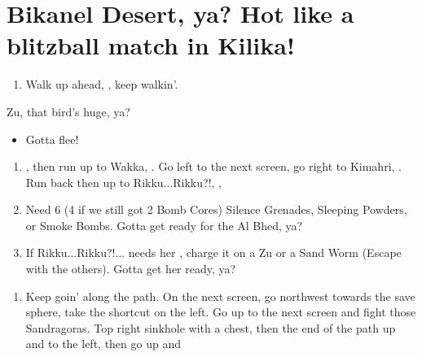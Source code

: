 \chapter{Bikanel Desert, ya? Hot like a blitzball match in Kilika!}

\begin{enumerate}
    \item Walk up ahead, \sd, keep walkin'.
\end{enumerate}
\begin{battle}{Zu, that bird's huge, ya?}
    \begin{itemize}
        \tidusf Tidus attacks, ya?
        \enemyf It attacks back!
        \tidusf Tidus equips Sonic Steel, like the Jecht Shot, ya?
        \tidusf Defend until Lulu shows up, gotta wait for backup, ya?
        \auronf Auron defends too, ya?
        \item Gotta flee!
    \end{itemize}
\end{battle}
\begin{enumerate}[resume]
    \item \sd, then run up to Wakka, \sd. Go left to the next screen, go right to Kimahri, \sd. Run back then up to Rikku...Rikku?!, \sd, \save
    \item Need 6 (4 if we still got 2 Bomb Cores) Silence Grenades, Sleeping Powders, or Smoke Bombs. Gotta get ready for the Al Bhed, ya?
    \item If Rikku...Rikku?!... needs her \od, charge it on a Zu or a Sand Worm (Escape with the others). Gotta get her ready, ya?
\end{enumerate}
\begin{enumerate}[resume]
    \item Keep goin' along the path. On the next screen, go northwest towards the save sphere, take the shortcut on the left. Go up to the next screen and fight those Sandragoras. Top right sinkhole with a chest, then the end of the path up and to the left, then go up and \sd
\end{enumerate}
